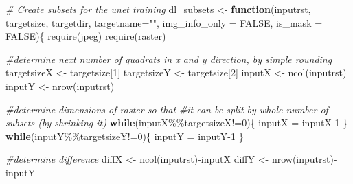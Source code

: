 \documentclass[
]{article}
\newenvironment{Shaded}{\begin{snugshade}}{\end{snugshade}}
\newcommand{\AttributeTok}[1]{\textcolor[rgb]{0.77,0.63,0.00}{#1}}
\newcommand{\CommentTok}[1]{\textcolor[rgb]{0.56,0.35,0.01}{\textit{#1}}}
\newcommand{\ConstantTok}[1]{\textcolor[rgb]{0.00,0.00,0.00}{#1}}
\newcommand{\ControlFlowTok}[1]{\textcolor[rgb]{0.13,0.29,0.53}{\textbf{#1}}}
\newcommand{\DecValTok}[1]{\textcolor[rgb]{0.00,0.00,0.81}{#1}}
\newcommand{\FunctionTok}[1]{\textcolor[rgb]{0.00,0.00,0.00}{#1}}
\newcommand{\NormalTok}[1]{#1}
\newcommand{\OtherTok}[1]{\textcolor[rgb]{0.56,0.35,0.01}{#1}}
\newcommand{\SpecialCharTok}[1]{\textcolor[rgb]{0.00,0.00,0.00}{#1}}
\newcommand{\StringTok}[1]{\textcolor[rgb]{0.31,0.60,0.02}{#1}}
\begin{document}
\begin{Shaded}
\begin{Highlighting}[]
\CommentTok{\# Create subsets for the unet training}
\NormalTok{dl\_subsets }\OtherTok{\textless{}{-}} \ControlFlowTok{function}\NormalTok{(inputrst, targetsize, targetdir, }\AttributeTok{targetname=}\StringTok{""}\NormalTok{, }
                       \AttributeTok{img\_info\_only =} \ConstantTok{FALSE}\NormalTok{, }\AttributeTok{is\_mask =} \ConstantTok{FALSE}\NormalTok{)\{}
  \FunctionTok{require}\NormalTok{(jpeg)}
  \FunctionTok{require}\NormalTok{(raster)}

  \CommentTok{\#determine next number of quadrats in x and y direction, by simple rounding}
\NormalTok{  targetsizeX }\OtherTok{\textless{}{-}}\NormalTok{ targetsize[}\DecValTok{1}\NormalTok{]}
\NormalTok{  targetsizeY }\OtherTok{\textless{}{-}}\NormalTok{ targetsize[}\DecValTok{2}\NormalTok{]}
\NormalTok{  inputX }\OtherTok{\textless{}{-}} \FunctionTok{ncol}\NormalTok{(inputrst)}
\NormalTok{  inputY }\OtherTok{\textless{}{-}} \FunctionTok{nrow}\NormalTok{(inputrst)}

  \CommentTok{\#determine dimensions of raster so that}
  \CommentTok{\#it can be split by whole number of subsets (by shrinking it)}
  \ControlFlowTok{while}\NormalTok{(inputX}\SpecialCharTok{\%\%}\NormalTok{targetsizeX}\SpecialCharTok{!=}\DecValTok{0}\NormalTok{)\{}
\NormalTok{    inputX }\OtherTok{=}\NormalTok{ inputX}\DecValTok{{-}1}  
\NormalTok{  \}}
  \ControlFlowTok{while}\NormalTok{(inputY}\SpecialCharTok{\%\%}\NormalTok{targetsizeY}\SpecialCharTok{!=}\DecValTok{0}\NormalTok{)\{}
\NormalTok{    inputY }\OtherTok{=}\NormalTok{ inputY}\DecValTok{{-}1}    
\NormalTok{  \}}

  \CommentTok{\#determine difference}
\NormalTok{  diffX }\OtherTok{\textless{}{-}} \FunctionTok{ncol}\NormalTok{(inputrst)}\SpecialCharTok{{-}}\NormalTok{inputX}
\NormalTok{  diffY }\OtherTok{\textless{}{-}} \FunctionTok{nrow}\NormalTok{(inputrst)}\SpecialCharTok{{-}}\NormalTok{inputY}


\end{Highlighting}
\end{Shaded}
\end{document}

